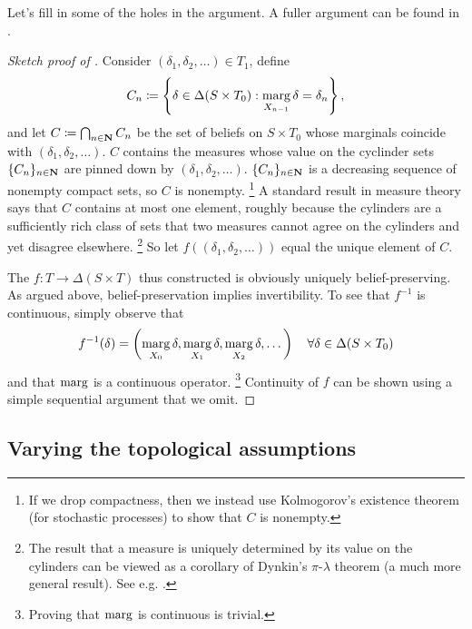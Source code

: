 \documentclass[11pt,letterpaper,reqno,oneside]{article}
\begin{document}
Let's fill in some of the holes in the argument. A fuller argument can be found in \textcite{BrandenburgerDekel1993}.
%
\begin{proof}[Sketch proof of ]
	Consider $(\delta_1,\delta_2,\dots) \in T_1$, define
	\begin{equation*}
		C_n \coloneqq \left\{ \delta \in \Delta( S \times T_0 ) :
		\operatorname*{marg}_{X_{n-1}} \delta = \delta_n 
		\right\} ,
	\end{equation*}
	and let $C \coloneqq \bigcap_{n \in \mathbf{N}} C_n$ be the set of beliefs on $S \times T_0$ whose marginals coincide with $(\delta_1,\delta_2,\dots)$. $C$ contains the measures whose value on the cyclinder sets $\{ C_n \}_{n \in \mathbf{N}}$ are pinned down by $(\delta_1,\delta_2,\dots)$. $\{ C_n \}_{n \in \mathbf{N}}$ is a decreasing sequence of nonempty compact sets, so $C$ is nonempty.%
		\footnote{If we drop compactness, then we instead use Kolmogorov's existence theorem (for stochastic processes) to show that $C$ is nonempty.} 
	A standard result in measure theory says that $C$ contains at most one element, roughly because the cylinders are a sufficiently rich class of sets that two measures cannot agree on the cylinders and yet disagree elsewhere.%
		\footnote{The result that a measure is uniquely determined by its value on the cylinders can be viewed as a corollary of Dynkin's $\pi$-$\lambda$ theorem (a much more general result). See e.g. \textcite[][sec. 3]{Billingsley1995}.}
	So let $f((\delta_1,\delta_2,\dots))$ equal the unique element of $C$.

	The $f : T \to \Delta( S \times T )$ thus constructed is obviously uniquely belief-preserving. As argued above, belief-preservation implies invertibility. To see that $f^{-1}$ is continuous, simply observe that
	\begin{equation*}
		f^{-1}(\delta) 
		= \left( \operatorname*{marg}_{X_0} \delta, 
		\operatorname*{marg}_{X_1} \delta, 
		\operatorname*{marg}_{X_2} \delta, \dots \right)
		\quad \forall \delta \in \Delta( S \times T_0 ) 
	\end{equation*}
	and that $\operatorname*{marg}$ is a continuous operator.%
		\footnote{Proving that $\operatorname*{marg}$ is continuous is trivial.}
	Continuity of $f$ can be shown using a simple sequential argument that we omit.
\end{proof}



\subsection{Varying the topological assumptions}
\label{sec:belief_hierarchies:varying_topolog}
\end{document}
